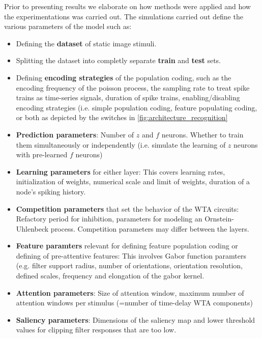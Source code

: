 \documentclass{report}
\begin{document}
Prior to presenting results we elaborate on how methods were applied and how the experimentations was carried out. The simulations carried out define the various parameters of the model such as:
\begin{itemize}
  \item Defining the \textbf{dataset} of static image stimuli.
  \item Splitting the dataset into completly separate \textbf{train} and \textbf{test} sets.
  \item Defining \textbf{encoding strategies} of the population coding, such as the encoding frequency of the poisson process, the sampling rate to treat spike trains as time-series signals, duration of spike trains, enabling/disabling encoding strategies (i.e. simple population coding, feature populating coding, or both as depicted by the switches in \cref{fig:architecture_recognition} 
  \item \textbf{Prediction parameters}: Number of $z$ and $f$ neurons. Whether to train them simultaneously or independently (i.e. simulate the learning of $z$ neurons with pre-learned $f$ neurons)
  \item \textbf{Learning parameters} for either layer: This covers learning rates, initialization of weights, numerical scale and limit of weights, duration of a node's spiking history.
  \item \textbf{Competition parameters} that set the behavior of the WTA circuits: Refactory period for inhibition, parameters for modeling an Ornstein-Uhlenbeck process. Competition parameters may differ between the layers.
  \item \textbf{Feature paramters} relevant for defining feature population coding or defining of pre-attentive features: This involves Gabor function paramters (e.g. filter support radius, number of orientations, orientation resolution, defined scales, frequency and elongation of the gabor kernel.
  \item \textbf{Attention parameters}: Size of attention window, maximum number of attention windows per stimulus (=number of time-delay WTA components)
  \item \textbf{Saliency parameters}: Dimensions of the saliency map and lower threshold values for clipping filter responses that are too low.
  \end{itemize}
  
\end{document}
